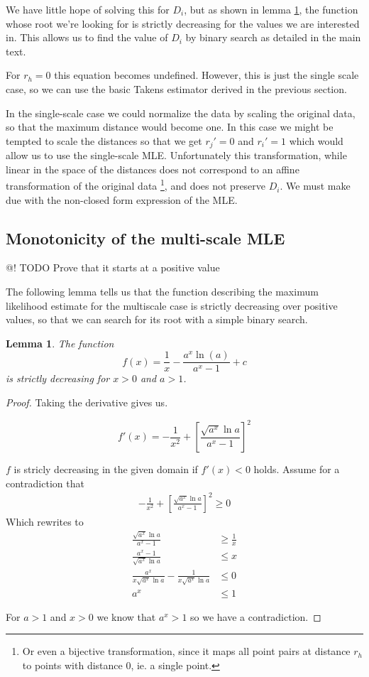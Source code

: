 \documentclass[11pt]{article}
\newtheorem{lma}{Lemma}
\begin{document}
We have little hope of solving this for $D_i$, but as shown in lemma \ref{monotonicity}, the function whose root we're looking for is strictly decreasing for the values we are interested in. This allows us to find the value of $D_i$ by binary search as detailed in the main text.

For $r_h = 0$ this equation becomes undefined. However, this is just the single scale case, so we can use the basic Takens estimator derived in the previous section.

In the single-scale case we could normalize the data by scaling the original data, so that the maximum distance would become one. In this case we might be tempted to scale the distances so that we get $r_j' = 0$ and $r_i' = 1$ which would allow us to use the single-scale MLE. Unfortunately this transformation, while linear in the space of the distances does not correspond to an affine transformation of the original data \footnote{Or even a bijective transformation, since it maps all point pairs at distance $r_h$ to points with distance $0$, ie. a single point.}, and does not preserve $D_i$. We must make due with the non-closed form expression of the MLE.

\subsection{Monotonicity of the multi-scale MLE}

@! TODO Prove that it starts at a positive value

The following lemma tells us that the function describing the maximum likelihood estimate for the multiscale case is strictly decreasing over positive values, so that we can search for its root with a simple binary search.

\begin{lma}
\label{monotonicity}
The function
\[
f(x) = \frac{1}{x} - \frac{a^x \ln(a)}{a^x - 1} + c
\]
is strictly decreasing for $ x > 0$ and $ a > 1$.
\end{lma}
\begin{proof}
Taking the derivative gives us. 

\[
f'(x) = -\frac{1}{x^2} + \left [ \frac{\sqrt{a^x}\ln a}{a^x - 1} \right ]^2
\]

$f$ is stricly decreasing in the given domain if $f'(x) < 0$ holds. Assume for a contradiction that
\begin{align*}
-\frac{1}{x^2} + \left [ \frac{\sqrt{a^x}\ln a}{a^x - 1} \right ]^2 \geq 0
\end{align*}
Which rewrites to 
\begin{align*}
\frac{\sqrt{a^x}\ln a}{a^x - 1}  &\geq \frac{1}{x}\\
\frac{a^x - 1}{\sqrt{a^x}\ln a} &\leq x \\
\frac{a^x}{x\sqrt{a^x}\ln a} - \frac{1}{x\sqrt{a^x}\ln a} &\leq 0 \\
a^x &\leq 1
\end{align*}

For $a>1$ and $x>0$ we know that $a^x > 1$ so we have a contradiction.
\end{proof}
\end{document}

